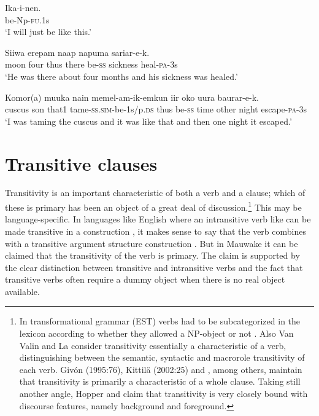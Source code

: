 \ea%
\label{ex:x1458}
\gll Ika-i-nen. \\
     be-Np-\textsc{fu}.1s \\
\glt `I will just be like this.'
\z

\ea%
\label{ex:x1459}
\gll Siiwa  erepam  naap     napuma  sariar-e-k. \\
     moon  four  thus  there  be-\textsc{ss}  sickness  heal-\textsc{pa}-3s \\
\glt `He was there about four months and his sickness was healed.'
\z

\ea%
\label{ex:x1460}
\gll Komor(a)  muuka  nain  memel-am-ik-emkun  \textstyleEmphasizedVernacularWords{-}  iir  oko  uura  baurar-e-k. \\
     cuscus  son  that1  tame-\textsc{ss}.\textsc{sim}-be-1s/p.\textsc{ds} thus  be-\textsc{ss}  time  other  night  escape-\textsc{pa}-3s \\
\glt `I was taming the cuscus and it was like that and then one night it escaped.'
\z

\section{Transitive clauses}
\hypertarget{RefHeading21961935131865}{}
Transitivity is an important characteristic of both a verb and a clause; which of these is primary has been an object of a great deal of discussion.\footnote{In transformational grammar (EST) verbs had to be subcategorized in the lexicon according to whether they allowed a NP-object or not \citep[120]{Radford1981}. Also Van Valin and La\citet[147-157]{Polla1997} consider transitivity essentially a characteristic of a verb, distinguishing between the semantic, syntactic and macrorole transitivity of each verb. Giv\'on (1995:76), Kittil\"a (2002:25) and \citet[115]{Dixon2010}, among others, maintain that transitivity is primarily a characteristic of a whole clause. Taking still another angle, Hopper and \citet[294]{Thompson1980} claim that transitivity is very closely bound with discourse features, namely background and foreground.} This may be language-specific. In languages like English where an intransitive verb like  can be made transitive in a construction  \citep[9]{Goldberg1995}, it makes sense to say that the verb combines with a transitive argument structure construction \citep[6]{Goldberg2006}. But in Mauwake it can be claimed that the transitivity of the verb is primary. The claim is supported by the clear distinction between transitive and intransitive verbs and the fact that transitive verbs often require a dummy object when there is no real object available.

